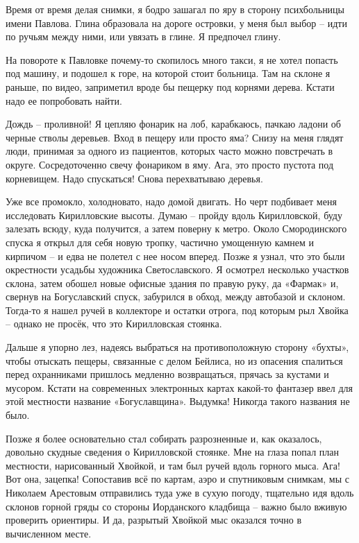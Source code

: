 Время от время делая снимки, я бодро зашагал по яру в сторону психбольницы имени Павлова. Глина образовала на дороге островки, у меня был выбор – идти по ручьям между ними, или увязать в глине. Я предпочел глину.

На повороте к Павловке почему-то скопилось много такси, я не хотел попасть под машину, и подошел к горе, на которой стоит больница. Там на склоне я раньше, по видео, заприметил вроде бы пещерку под корнями дерева. Кстати надо ее попробовать найти.

Дождь – проливной! Я цепляю фонарик на лоб, карабкаюсь, пачкаю ладони об черные стволы деревьев. Вход в пещеру или просто яма? Снизу на меня глядят люди, принимая за одного из пациентов, которых часто можно повстречать в округе. Сосредоточенно свечу фонариком в яму. Ага, это просто пустота под корневищем. Надо спускаться! Снова перехватываю деревья.

Уже все промокло, холодновато, надо домой двигать. Но черт подбивает меня исследовать Кирилловские высоты. Думаю – пройду вдоль Кирилловской, буду залезать всюду, куда получится, а затем поверну к метро. Около Смородинского спуска я открыл для себя новую тропку, частично умощенную камнем и кирпичом – и едва не полетел с нее носом вперед. Позже я узнал, что это были окрестности усадьбы художника Светославского. Я осмотрел несколько участков склона, затем обошел новые офисные здания по правую руку, да «Фармак» и, свернув на Богуславский спуск, забурился в обход, между автобазой и склоном. Тогда-то я нашел ручей в коллекторе и остатки отрога, под которым рыл Хвойка – однако не просёк, что это Кирилловская стоянка.

Дальше я упорно лез, надеясь выбраться на противоположную сторону «бухты», чтобы отыскать пещеры, связанные с делом Бейлиса, но из опасения спалиться перед охранниками пришлось медленно возвращаться, прячась за кустами и мусором. Кстати на современных электронных картах какой-то фантазер ввел для этой местности название «Богуславщина». Выдумка! Никогда такого названия не было.
 
Позже я более основательно стал собирать разрозненные и, как оказалось, довольно скудные сведения о Кирилловской стоянке. Мне на глаза попал план местности, нарисованный Хвойкой, и там был ручей вдоль горного мыса. Ага! Вот она, зацепка! Сопоставив всё по картам, аэро и спутниковым снимкам, мы с Николаем Арестовым отправились туда уже в сухую погоду, тщательно идя вдоль склонов горной гряды со стороны Иорданского кладбища – важно было вживую проверить ориентиры. И да, разрытый Хвойкой мыс оказался точно в вычисленном месте.

